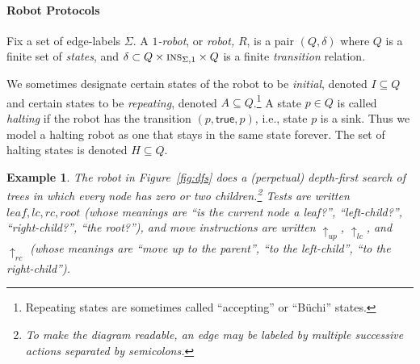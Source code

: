 \documentclass{aamas2015}
\newtheorem{example}{Example}
\def\true{\textsf{true}}
\def\ins{\textsc{ins}}
\def\msol{\mathsf{MSOL}}
\newcommand{\sr}[1]{\footnote{{\color{red} Note. #1}}}
\begin{document}
\paragraph{Robot Protocols}  \label{rp}
Fix a set of edge-labels $\Sigma$. A {\em $1$-robot}, or {\em robot,} $R$, is a pair $(Q,\delta)$ where $Q$ is a finite set of {\em states}, and $\delta \subset Q \times \ins_{\Sigma,1} \times Q$ is a finite {\em transition} relation. 



We sometimes designate certain states of the robot to be {\em initial}, denoted $I \subseteq Q$ and certain states to be {\em repeating}, denoted $A \subseteq Q$.\footnote{Repeating states are sometimes called ``accepting'' or ``B\"uchi'' states.} A state $p \in Q$ is called {\em halting} if the robot has the transition $(p,\true,p)$, i.e., state $p$ is a sink.  Thus we model a halting robot as one that stays in the same state forever. The set of halting states is denoted $H \subseteq Q$.


\begin{example}
The robot in Figure~\ref{fig:dfs} does a (perpetual) depth-first search of trees  in which every node has zero or two children.\footnote{To make the diagram readable, an edge may be labeled by multiple successive actions separated by semicolons.} Tests are written $leaf, lc,rc,root$ (whose meanings are ``is the current node a leaf?'', ``left-child?'', ``right-child?'', ``the root?''), and move instructions are written $\uparrow_{up}$, $\uparrow_{lc}$, and $\uparrow_{rc}$ (whose meanings are ``move up to the parent'', ``to the left-child'', ``to the right-child'').
\end{example}
\end{document}
